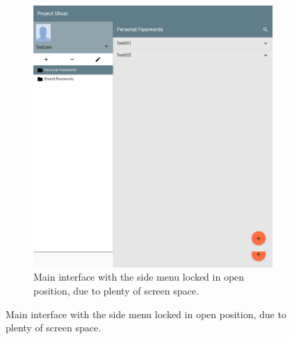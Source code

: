 		\begin{figure}
			\centering
			\begin{subfigure}[b]{0.75\textwidth}
				\includegraphics[width=\linewidth,clip,trim=0 800 200 0]{figures/implementation/screenshots/ghost_main_locked_menu.png}
				\caption{Main interface with the side menu locked in open position, due to plenty of screen space.}
				\label{fig:impl:responsive:locked}
			\end{subfigure}


\end{figure}
